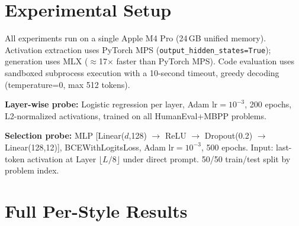 \documentclass[11pt]{article}
\begin{document}
\section{Experimental Setup}
\label{app:setup}

All experiments run on a single Apple M4 Pro (24\,GB unified memory). Activation extraction uses PyTorch MPS (\texttt{output\_hidden\_states=True}); generation uses MLX ($\approx$17$\times$ faster than PyTorch MPS). Code evaluation uses sandboxed subprocess execution with a 10-second timeout, greedy decoding (temperature=0, max 512 tokens).

\textbf{Layer-wise probe:} Logistic regression per layer, Adam lr$=10^{-3}$, 200 epochs, L2-normalized activations, trained on all HumanEval+MBPP problems.

\textbf{Selection probe:} MLP [Linear($d$,128) $\to$ ReLU $\to$ Dropout(0.2) $\to$ Linear(128,12)], BCEWithLogitsLoss, Adam lr$=10^{-3}$, 500 epochs. Input: last-token activation at Layer $\lfloor L/8 \rfloor$ under direct prompt. 50/50 train/test split by problem index.

\section{Full Per-Style Results}
\label{app:full_results}
\end{document}
